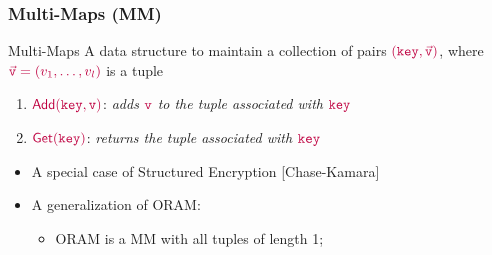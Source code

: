 \documentclass[]{beamer}
\newcommand{\key}{\mathtt{key}}
\newcommand{\GetMM}{\mathsf{Get}}
\newcommand{\AddMM}{\mathsf{Add}}
\newcommand{\vals}{\vec{\mathtt{v}}}
\newcommand{\val}{{\mathtt{v}}}
\begin{document}
\begin{frame}
\frametitle{Multi-Maps (MM)}
\begin{block}{Multi-Maps}
A {\color{blue} data structure} to maintain a collection of pairs $\color{purple}(\key,\vals)$,
where $\color{purple}\vals=(v_1,\ldots,v_l)$ is a tuple
\begin{enumerate}
\vskip 1cm
\item $\color{purple}\AddMM(\key,\val)$: {\em adds $\color{purple}\val$ to the tuple associated with $\color{purple}\key$}
\vskip 1cm
\item $\color{purple}\GetMM(\key)$: {\em returns the tuple associated with $\color{purple}\key$}
\end{enumerate}
\end{block}
\pause
\begin{itemize}[<+->]
\item A special case of {\color{red} Structured Encryption} [Chase-Kamara]
\item A {\color{purple} generalization} of ORAM:
    \begin{itemize}
        \item ORAM is a MM with all tuples of length 1;
    \end{itemize}
\end{itemize}
\end{frame}


\end{document}
